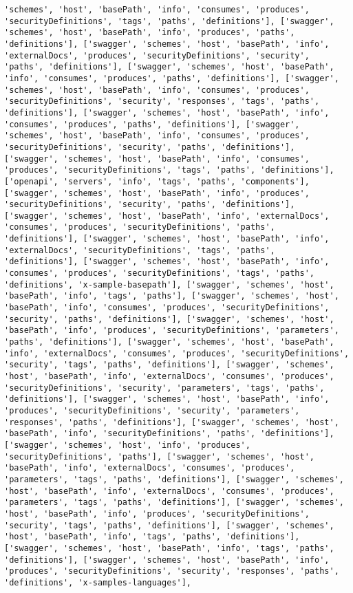 \documentclass[11pt]{article}
\begin{document}
\begin{Verbatim}[commandchars=\\\{\}]
'schemes', 'host', 'basePath', 'info', 'consumes', 'produces', 'securityDefinitions', 'tags', 'paths', 'definitions'], ['swagger', 'schemes', 'host', 'basePath', 'info', 'produces', 'paths', 'definitions'], ['swagger', 'schemes', 'host', 'basePath', 'info', 'externalDocs', 'produces', 'securityDefinitions', 'security', 'paths', 'definitions'], ['swagger', 'schemes', 'host', 'basePath', 'info', 'consumes', 'produces', 'paths', 'definitions'], ['swagger', 'schemes', 'host', 'basePath', 'info', 'consumes', 'produces', 'securityDefinitions', 'security', 'responses', 'tags', 'paths', 'definitions'], ['swagger', 'schemes', 'host', 'basePath', 'info', 'consumes', 'produces', 'paths', 'definitions'], ['swagger', 'schemes', 'host', 'basePath', 'info', 'consumes', 'produces', 'securityDefinitions', 'security', 'paths', 'definitions'], ['swagger', 'schemes', 'host', 'basePath', 'info', 'consumes', 'produces', 'securityDefinitions', 'tags', 'paths', 'definitions'], ['openapi', 'servers', 'info', 'tags', 'paths', 'components'], ['swagger', 'schemes', 'host', 'basePath', 'info', 'produces', 'securityDefinitions', 'security', 'paths', 'definitions'], ['swagger', 'schemes', 'host', 'basePath', 'info', 'externalDocs', 'consumes', 'produces', 'securityDefinitions', 'paths', 'definitions'], ['swagger', 'schemes', 'host', 'basePath', 'info', 'externalDocs', 'securityDefinitions', 'tags', 'paths', 'definitions'], ['swagger', 'schemes', 'host', 'basePath', 'info', 'consumes', 'produces', 'securityDefinitions', 'tags', 'paths', 'definitions', 'x-sample-basepath'], ['swagger', 'schemes', 'host', 'basePath', 'info', 'tags', 'paths'], ['swagger', 'schemes', 'host', 'basePath', 'info', 'consumes', 'produces', 'securityDefinitions', 'security', 'paths', 'definitions'], ['swagger', 'schemes', 'host', 'basePath', 'info', 'produces', 'securityDefinitions', 'parameters', 'paths', 'definitions'], ['swagger', 'schemes', 'host', 'basePath', 'info', 'externalDocs', 'consumes', 'produces', 'securityDefinitions', 'security', 'tags', 'paths', 'definitions'], ['swagger', 'schemes', 'host', 'basePath', 'info', 'externalDocs', 'consumes', 'produces', 'securityDefinitions', 'security', 'parameters', 'tags', 'paths', 'definitions'], ['swagger', 'schemes', 'host', 'basePath', 'info', 'produces', 'securityDefinitions', 'security', 'parameters', 'responses', 'paths', 'definitions'], ['swagger', 'schemes', 'host', 'basePath', 'info', 'securityDefinitions', 'paths', 'definitions'], ['swagger', 'schemes', 'host', 'info', 'produces', 'securityDefinitions', 'paths'], ['swagger', 'schemes', 'host', 'basePath', 'info', 'externalDocs', 'consumes', 'produces', 'parameters', 'tags', 'paths', 'definitions'], ['swagger', 'schemes', 'host', 'basePath', 'info', 'externalDocs', 'consumes', 'produces', 'parameters', 'tags', 'paths', 'definitions'], ['swagger', 'schemes', 'host', 'basePath', 'info', 'produces', 'securityDefinitions', 'security', 'tags', 'paths', 'definitions'], ['swagger', 'schemes', 'host', 'basePath', 'info', 'tags', 'paths', 'definitions'], ['swagger', 'schemes', 'host', 'basePath', 'info', 'tags', 'paths', 'definitions'], ['swagger', 'schemes', 'host', 'basePath', 'info', 'produces', 'securityDefinitions', 'security', 'responses', 'paths', 'definitions', 'x-samples-languages'], 
\end{Verbatim}
\end{document}
